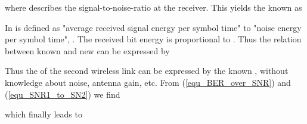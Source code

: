 \documentclass[times,10pt,twocolumn]{article}
\begin{document}
where  describes the signal-to-noise-ratio at the receiver. This yields the known  as

In \cite{fundamentals_wireless_comm}  is defined as "average received signal energy per symbol time" to "noise energy per symbol time", . The received bit energy is proportional to . Thus the relation between known  and new  can be expressed by

Thus the  of the second wireless link can be expressed by the known , without knowledge about noise, antenna gain, etc. From (\ref{equ_BER_over_SNR}) and (\ref{equ_SNR1_to_SN2}) we find

which finally leads to

\nocite{ex1,ex2}


\end{document}
